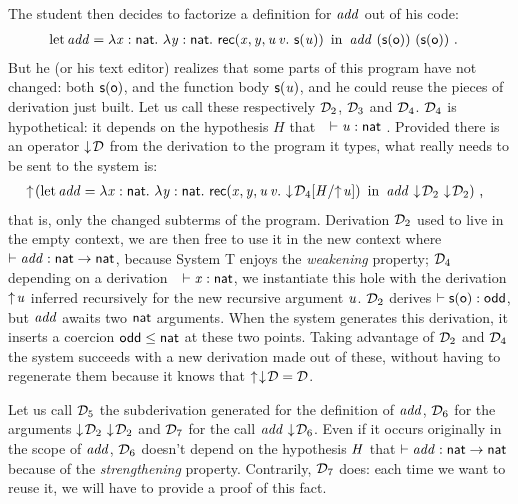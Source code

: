 \documentclass{llncs}
\begin{document}
The student then decides to factorize a definition for $\text{\textit{add}}$ out
of his code:
\begin{align*}
  &\operatorname{let}{{\text{\textit{add}}}}={\lambda{\ensuremath{\text{\textit{x}}}}:{\text{\textsf{nat}}}.\  \lambda{\ensuremath{\text{\textit{y}}}}:{\text{\textsf{nat}}}.\  \text{\textsf{rec}}({\text{\textit{x}}},{\text{\textit{y}}},{\text{\textit{u}}}\,{\text{\textit{v}}}.\ {\text{\textsf{s}} ({\text{\textit{u}}})})}\ \operatorname{in}\ 
  {\text{\textit{add}}}\ {(\text{\textsf{s}} ({\text{\textsf{o}}}))}\ {(\text{\textsf{s}} ({\text{\textsf{o}}}))} \ \text{.}
\end{align*}
But he (or his text editor) realizes that some parts of this program
have not changed: both $\text{\textsf{s}} ({\text{\textsf{o}}})$, and the function body $\text{\textsf{s}} ({\text{\textit{u}}})$, and
he could reuse the pieces of derivation just built. Let us call these
respectively $\mathcal D_2$, $\mathcal D_3$ and $\mathcal D_4$. $\mathcal D_4$ is hypothetical: it
depends on the hypothesis $H$ that\ \ $\vdash \text{\textit{u}}:\text{\textsf{nat}}$ .
Provided there is an operator $\downarrow\!{\mathcal D}$ from the derivation to the
program it types, what really needs to be sent to the system is:
\begin{align*}
  &\uparrow\!{}(
    \operatorname{let}{{\text{\textit{add}}}}={\lambda{\ensuremath{\text{\textit{x}}}}:{\text{\textsf{nat}}}.\  \lambda{\ensuremath{\text{\textit{y}}}}:{\text{\textsf{nat}}}.\  \text{\textsf{rec}}({\text{\textit{x}}},{\text{\textit{y}}},{\text{\textit{u}}}\,{\text{\textit{v}}}.\ {\downarrow\!{{\mathcal D_4}[{{\text{\textit{H}}}/{\uparrow\!{\text{\textit{u}}}}}]}})}\ \operatorname{in}\ 
    {\text{\textit{add}}}\ {\downarrow\!{\mathcal D_2}}\ {\downarrow\!{\mathcal D_2}}
  )
\ \text{,}
\end{align*}
that is, only the changed subterms of the program. Derivation $\mathcal D_2$
used to live in the empty context, we are then free to use it in the
new context where $\vdash\text{\textit{add}}:\text{\textsf{nat}}\to\text{\textsf{nat}}$, because System
\sysname T enjoys the \emph{weakening} property; $\mathcal D_4$ depending on
a derivation\ \ $\vdash\text{\textit{x}}:\text{\textsf{nat}}$, we instantiate this hole
with the derivation $\uparrow\!{\text{\textit{u}}}$ inferred recursively for the new
recursive argument $\text{\textit{u}}$. $\mathcal D_2$ derives $\vdash \text{\textsf{s}} ({\text{\textsf{o}}}) :
\text{\textsf{odd}}$, but $\text{\textit{add}}$ awaits two $\text{\textsf{nat}}$ arguments. When the
system generates this derivation, it inserts a coercion $\text{\textsf{odd}}
\leq \text{\textsf{nat}}$ at these two points. Taking advantage of $\mathcal D_2$ and
$\mathcal D_4$ the system succeeds with a new derivation made out of these,
without having to regenerate them because it knows that
$\uparrow\!{\downarrow\!{\mathcal D}} = \mathcal D$.

Let us call $\mathcal D_5$ the subderivation generated for the definition of
$\text{\textit{add}}$, $\mathcal D_6$ for the arguments
${\downarrow\!{\mathcal D_2}}\ {\downarrow\!{\mathcal D_2}}$ and $\mathcal D_7$ for the call
${\text{\textit{add}}}\  {\downarrow\!{\mathcal D_6}}$. Even if it occurs originally in the
scope of $\text{\textit{add}}$, $\mathcal D_6$ doesn't depend on the hypothesis $\text{\textit{H}}$ that $\vdash \text{\textit{add}}:\text{\textsf{nat}}\to\text{\textsf{nat}}$ because of the
\emph{strengthening} property. Contrarily, $\mathcal D_7$ does: each time we
want to reuse it, we will have to provide a proof of this fact.
\end{document}
